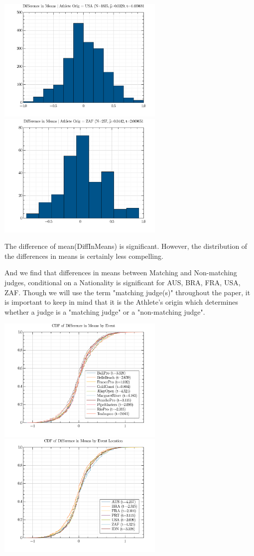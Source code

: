 \documentclass{article}
\theoremstyle{definition}
\begin{document}
\includegraphics[width=8cm]{./src/visuals/DistOfDiffInMeansForUSA.png}
\includegraphics[width=8cm]{./src/visuals/DistOfDiffInMeansForZAF.png}

The difference of mean(DiffInMeans) is significant. However, the distribution of the differences in means is certainly less compelling. 

And we find that differences in means between Matching and Non-matching judges, conditional on a Nationality is significant for AUS, BRA, FRA, USA, ZAF. Though we will use the term "matching judge(s)" throughout the paper, it is important to keep in mind that it is the Athlete's origin which determines whether a judge is a "matching judge" or a "non-matching judge".

\includegraphics[width=8cm]{./src/visuals/DiffInMeansCDFbyevent.png}
\includegraphics[width=8cm]{./src/visuals/DiffInMeansCDFbyeventOrig.png}
\end{document}
